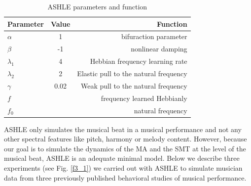 \documentclass{report}
\begin{document}
\begin{table}
    \begin{center}
      \caption{ASHLE parameters and function}
      \label{tab:t3_2}
      \begin{tabular}{l|c|r}
        \textbf{Parameter} & \textbf{Value} & \textbf{Function}\\
        \hline
        $\alpha$ & 1 & bifuraction parameter\\
        \hline
        $\beta$ & -1 & nonlinear damping\\
        \hline
        $\lambda_1$ & 4 & Hebbian frequency learning rate\\
        \hline
        $\lambda_2$ & 2 & Elastic pull to the natural frequency\\
        \hline
        $\gamma$ & 0.02 & Weak pull to the natural frequency\\
        \hline
        $f$ &  & frequency learned Hebbianly\\
        \hline
        $f_0$ &  & natural frequency\\
      \end{tabular}
    \end{center}   
\end{table}

ASHLE only simulates the musical beat in a musical performance and not any other spectral features like pitch, harmony or melody content. However, because our goal is to simulate the dynamics of the MA and the SMT at the level of the musical beat, ASHLE is an adequate minimal model. Below we describe three experiments (see Fig.{} \ref{f3_1}) we carried out with ASHLE to simulate musician data from three previously published behavioral studies of musical performance.
\end{document}

